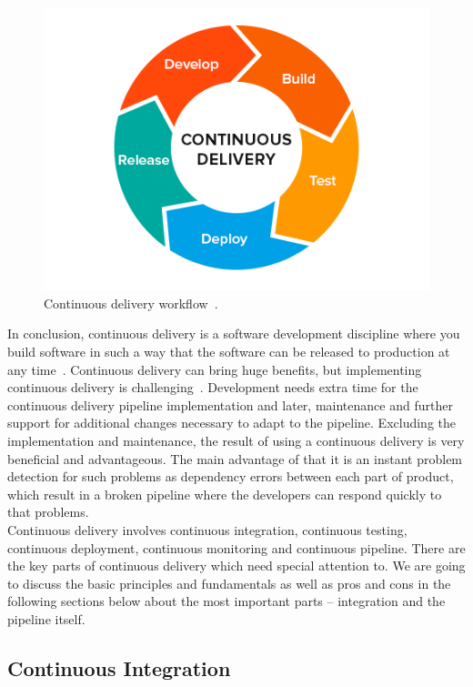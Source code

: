 \documentclass[12pt,a4paper]{article}
\theoremstyle{definition}
\begin{document}
    \begin{figure}[H]
        \centering
        \includegraphics[scale=0.5]{img/cd.png}
        \caption{Continuous delivery workflow~\cite{cd1}.}
        \label{fig:cd}
    \end{figure}

    In conclusion, continuous delivery is a software development discipline where you build software in such a way that the software can be released to production at any time~\cite{cd2}. Continuous delivery can bring huge benefits, but implementing continuous delivery is challenging~\cite{8452107}. Development needs extra time for the continuous delivery pipeline implementation and later, maintenance and further support for additional changes necessary to adapt to the pipeline. Excluding the implementation and maintenance, the result of using a continuous delivery is very beneficial and advantageous. The main advantage of that it is an instant problem detection for such problems as dependency errors between each part of product, which result in a broken pipeline where the developers can respond quickly to that problems.\\

    Continuous delivery involves continuous integration, continuous testing, continuous deployment, continuous monitoring and continuous pipeline. There are the key parts of continuous delivery which need special attention to. We are going to discuss the basic principles and fundamentals as well as pros and cons in the following sections below about the most important parts -- integration and the pipeline itself.

    \subsection{Continuous Integration}
\end{document}
